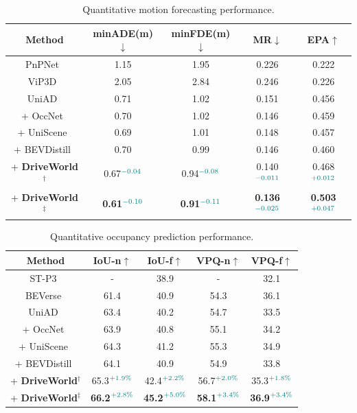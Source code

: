 \begin{table}[t]
	\centering
	\resizebox{0.5\textwidth}{!}
	{
		\begin{tabular}{c|c|c|c|c}
			\toprule
			\textbf{Method}&\textbf{minADE(m)}$\downarrow$&\textbf{minFDE(m)}$\downarrow$&\textbf{MR}$\downarrow$&\textbf{EPA}$\uparrow$\\
			\midrule
			PnPNet~\cite{pnpnet} &1.15&1.95&0.226&0.222\\
			ViP3D~\cite{vip3d} &2.05&2.84&0.246&0.226\\
			\midrule
			UniAD~\cite{uniad}&0.71&1.02&0.151&0.456 \\
			+ OccNet~\cite{occnet}&0.70&1.02&0.146&0.459 \\
			+ UniScene~\cite{uniscene}&0.69&1.01&0.148&0.457 \\
			+ BEVDistill~\cite{bevdistill}&0.70&0.99&0.146&0.460 \\
			\midrule
			\rowcolor{gray!10}+ \textbf{DriveWorld}$^{\dagger }$  &0.67$^{\textcolor{teal} {-0.04}}$&0.94$^{\textcolor{teal} {-0.08}}$&0.140$^{\textcolor{teal} {-0.011}}$&0.468$^{\textcolor{teal} {+0.012}}$\\
			\rowcolor{gray!10}+ \textbf{DriveWorld}$^{\ddagger }$ &\bf0.61$^{\textcolor{teal} {-0.10}}$&\bf0.91$^{\textcolor{teal} {-0.11}}$&\bf0.136$^{\textcolor{teal} {-0.025}}$&\bf0.503$^{\textcolor{teal} {+0.047}}$\\ 
			\bottomrule
		\end{tabular}
	}
	\caption{Quantitative motion forecasting performance.}
	\label{tab:forecasting}
\end{table}
\begin{table}[t]
	\centering
	\resizebox{0.5\textwidth}{!}
	{
		\begin{tabular}{c|c|c|c|c}
			\toprule
			\textbf{Method}&\textbf{IoU-n}$\uparrow$&\textbf{IoU-f}$\uparrow$&\textbf{VPQ-n}$\uparrow$&\textbf{VPQ-f}$\uparrow$\\
			\midrule
			ST-P3~\cite{stp3} &-&38.9&-&32.1\\
			BEVerse~\cite{beverse} &61.4&40.9&54.3&36.1\\
			\midrule
			UniAD~\cite{uniad} &63.4&40.2&54.7&33.5\\
			+ OccNet~\cite{occnet} &63.9&40.8&55.1&34.2\\
			+ UniScene~\cite{uniscene} &64.3&41.2&55.3&34.9\\
			+ BEVDistill~\cite{bevdistill} &64.1&40.9&54.9&33.8\\
			\midrule
			\rowcolor{gray!10}+ \textbf{DriveWorld}$^{\dagger }$  &65.3$^{\textcolor{teal} {+1.9\%}}$&42.4$^{\textcolor{teal} {+2.2\%}}$&56.7$^{\textcolor{teal} {+2.0\%}}$&35.3$^{\textcolor{teal} {+1.8\%}}$\\
			\rowcolor{gray!10}+ \textbf{DriveWorld}$^{\ddagger }$ &\bf66.2$^{\textcolor{teal} {+2.8\%}}$&\bf45.2$^{\textcolor{teal} {+5.0\%}}$&\bf58.1$^{\textcolor{teal} {+3.4\%}}$&\bf36.9$^{\textcolor{teal} {+3.4\%}}$\\
			\bottomrule
		\end{tabular}
	}
	\caption{Quantitative occupancy prediction performance.}
	\label{tab:occ}
\end{table}

